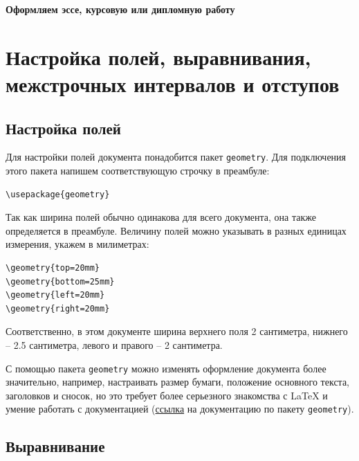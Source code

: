 \documentclass[12pt]{article}
\begin{document}
\begin{center}
{\Large{\textbf{Оформляем эссе, курсовую или дипломную работу}}}
\end{center}

\section{Настройка полей, выравнивания, межстрочных интервалов и отступов}

\subsection{Настройка полей}

Для настройки полей документа понадобится пакет \texttt{geometry}. Для подключения этого пакета напишем соответствующую строчку в преамбуле:

\begin{center}
\begin{BVerbatim}
\usepackage{geometry}
\end{BVerbatim} 
\end{center}

Так как ширина полей обычно одинакова для всего документа, она также определяется в преамбуле. Величину полей можно указывать в разных единицах измерения, укажем в милиметрах:

\begin{center}
\begin{BVerbatim}
\geometry{top=20mm} 
\geometry{bottom=25mm}
\geometry{left=20mm} 
\geometry{right=20mm}
\end{BVerbatim} 
\end{center}

Соответственно, в этом документе ширина верхнего поля 2 сантиметра, нижнего -- 2.5 сантиметра, левого  и правого -- 2 сантиметра.

С помощью пакета \texttt{geometry} можно изменять оформление документа более значительно, например, настраивать размер бумаги, положение основного текста, заголовков и сносок, но это требует более серьезного знакомства с \LaTeX{} и умение работать с документацией (\href{http://mirror.macomnet.net/pub/CTAN/macros/latex/contrib/geometry/geometry.pdf}{ссылка} на документацию по пакету \texttt{geometry}).

\subsection{Выравнивание}
\end{document}
